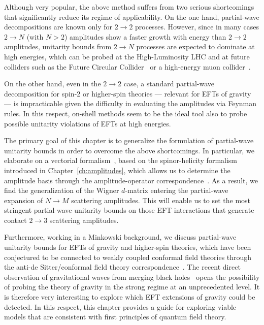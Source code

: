Although very popular, the above method suffers from two serious shortcomings that significantly reduce its regime of applicability. On the one hand, partial-wave decompositions are known only for $2\to 2$ processes. 
However, since in many cases $2 \to N$ (with $N > 2$) amplitudes show a faster growth with energy than $2 \to 2$ amplitudes, unitarity bounds from $2 \to N$ processes
are expected to dominate at high energies, which can be probed at the High-Luminosity LHC
and at future colliders such as the Future Circular Collider~\cite{FCC:2018byv} or a high-energy muon
collider~\cite{Accettura:2023ked}.

On the other hand, even in the $2\to 2$ case, a standard partial-wave decomposition for spin-2 or higher-spin theories --- relevant for EFTs of gravity --- is impracticable given the difficulty in evaluating the amplitudes via Feynman rules.
In this respect, on-shell methods seem to be the ideal tool also to probe possible unitarity violations of EFTs at high energies.

The primary goal of this chapter is to generalize the formulation of partial-wave unitarity bounds in order to overcome the above shortcomings. 
In particular, we elaborate on a vectorial formalism~\cite{Jiang:2020rwz}, based on the
spinor-helicity formalism~\cite{Dixon:2013uaa} introduced in Chapter~\ref{ch:amplitudes}, which
allows us to determine the amplitude basis through the amplitude-operator
correspondence~\cite{Shadmi:2018xan,Durieux:2019eor,Dong:2021vxo,Li:2022tec}.
As a result, we find the generalization of the Wigner $d$-matrix entering the partial-wave expansion of $N \to M$ scattering amplitudes. 
This will enable us to set the most stringent partial-wave unitarity bounds on those EFT interactions that generate contact $2\to 3$ scattering amplitudes.

Furthermore, working in a Minkowski background, we discuss partial-wave unitarity 
bounds for EFTs of gravity and higher-spin theories, which have been conjectured 
to be connected to weakly coupled conformal field theories through the anti-de Sitter/conformal field theory correspondence~\cite{Klebanov:2002ja}. The recent direct observation of gravitational waves from merging black holes~\cite{LIGOScientific:2016aoc,LIGOScientific:2018mvr,KAGRA:2021vkt} opens the possibility of probing the theory of gravity in the strong regime at an unprecedented level. It is therefore very interesting to explore which EFT extensions of gravity could be detected. In this respect, this chapter provides a guide for exploring viable models that are consistent with first principles of quantum field theory.

